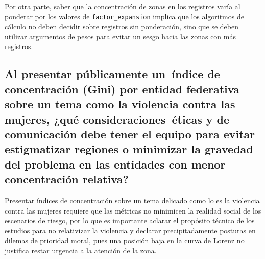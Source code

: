 \documentclass[11pt,a4paper]{article}
\begin{document}
Por otra parte, saber que la concentración de zonas en los registros varía al ponderar por los valores de \texttt{factor\_expansion} implica que los algoritmos de cálculo no deben decidir sobre registros sin ponderación, sino que se deben utilizar argumentos de pesos para evitar un sesgo hacia las zonas con más registros.

\subsection{Al presentar públicamente un índice de concentración (Gini) por entidad federativa sobre un tema como la violencia contra las mujeres, ¿qué consideraciones éticas y de comunicación debe tener el equipo para evitar estigmatizar regiones o minimizar la gravedad del problema en las entidades con menor concentración relativa?}

Presentar índices de concentración sobre un tema delicado como lo es la violencia contra las mujeres requiere que las métricas no minimicen la realidad social de los escenarios de riesgo, por lo que es importante aclarar el propósito técnico de los estudios para no relativizar la violencia y declarar precipitadamente posturas en dilemas de prioridad moral, pues una posición baja en la curva de Lorenz no justifica restar urgencia a la atención de la zona.
\end{document}
